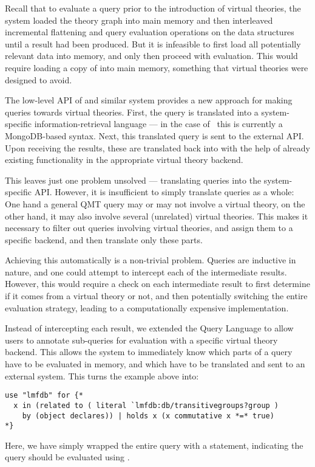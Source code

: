 Recall that to evaluate a query prior to the introduction of virtual theories, the \mmt system loaded the theory graph into main memory and then interleaved incremental flattening and query evaluation operations on the \mmt data structures until a result had been produced. 
But it is infeasible to first load all potentially relevant data into memory, and only then proceed with evaluation. 
This would require loading a copy of \lmfdb into main memory, something that virtual theories were designed to avoid. 

The low-level API of  \lmfdb and similar system provides a new approach for making queries towards virtual theories. 
First, the \mmt query is translated into a system-specific information-retrieval language --- in the case of \lmfdb\ this is currently a MongoDB-based syntax.
Next, this translated query is sent to the external API. 
Upon receiving the results, these are translated back into \ommt with the help of already existing functionality in the appropriate virtual theory backend.

This leaves just one problem unsolved --- translating queries into the system-specific API. 
However, it is insufficient to simply translate queries as a whole: 
One hand a general QMT query may or may not involve a virtual theory, on the other hand, it may also involve several (unrelated) virtual theories. 
This makes it necessary to filter out queries involving virtual theories, and assign them to a specific backend, and then translate only these parts. 

Achieving this automatically is a non-trivial problem. 
Queries are inductive in nature, and one could attempt to intercept each of the intermediate results. 
However, this would require a check on each intermediate result to first determine if it comes from a virtual theory or not, and then potentially switching the entire evaluation strategy, leading to a computationally expensive implementation. 

Instead of intercepting each result, we extended the Query Language to allow users to annotate sub-queries for evaluation with a specific virtual theory backend. 
This allows the system to immediately know which parts of a query have to be evaluated in \mmt memory, and which have to be translated and sent to an external system. 
This turns the example above into:
\begin{lstlisting}[language=qmt]
use "lmfdb" for {*
  x in (related to ( literal `lmfdb:db/transitivegroups?group ) 
    by (object declares)) | holds x (x commutative x *=* true)
*}
\end{lstlisting}
Here, we have simply wrapped the entire query with a  statement, indicating the query should be evaluated using \lmfdb. 

